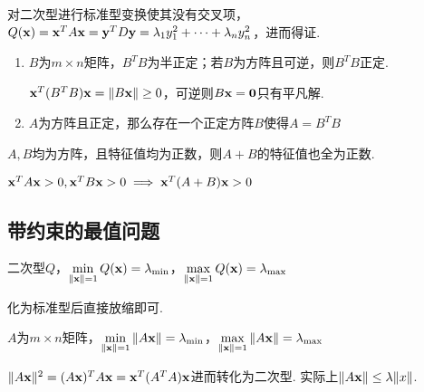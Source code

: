 \begin{analysis}
对二次型进行标准型变换使其没有交叉项，$Q(\mathbf{x})=\mathbf{x}^TA\mathbf{x}=\mathbf{y}^TD\mathbf{y}=\lambda_1y_1^2+\cdots+\lambda_ny_n^2$，进而得证.
\end{analysis}
\begin{proposition}
\begin{enumerate}
\itemsep -3pt
\item $B$为$m\times n$矩阵，$B^TB$为半正定；若$B$为方阵且可逆，则$B^TB$正定.
\begin{analysis}
$\mathbf{x}^T(B^TB)\mathbf{x}=\|B\mathbf{x}\|\geq 0$，可逆则$B\mathbf{x}=\mathbf{0}$只有平凡解.
\end{analysis}
\item $A$为方阵且正定，那么存在一个正定方阵$B$使得$A=B^TB$
\end{enumerate}
\end{proposition}
\begin{proposition}
$A,B$均为方阵，且特征值均为正数，则$A+B$的特征值也全为正数.
\end{proposition}
\begin{analysis}
$\mathbf{x}^TA\mathbf{x}>0,\mathbf{x}^TB\mathbf{x}>0\implies\mathbf{x}^T(A+B)\mathbf{x}>0$
\end{analysis}

\subsection{带约束的最值问题}
\begin{theorem}
二次型$Q$，$\displaystyle\min_{\|\mathbf{x}\|=1}Q(\mathbf{x})=\lambda_{\min}$，$\displaystyle\max_{\|\mathbf{x}\|=1}Q(\mathbf{x})=\lambda_{\max}$
\end{theorem}
\begin{analysis}
化为标准型后直接放缩即可.
\end{analysis}
\begin{theorem}
$A$为$m\times n$矩阵，$\displaystyle\min_{\|\mathbf{x}\|=1}\|A\mathbf{x}\|=\lambda_{\min}$，$\displaystyle\max_{\|\mathbf{x}\|=1}\|A\mathbf{x}\|=\lambda_{\max}$
\end{theorem}
\begin{analysis}
$\|A\mathbf{x}\|^2=(A\mathbf{x})^TA\mathbf{x}=\mathbf{x}^T(A^TA)\mathbf{x}$进而转化为二次型. 实际上$\|A\mathbf{x}\|\leq\lambda\|x\|$.
\end{analysis}